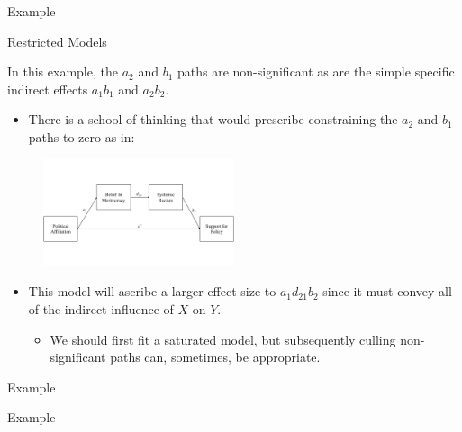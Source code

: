 \documentclass{beamer}
\newcommand{\vb}[0]{\vspace{6pt}}
\begin{document}
\begin{frame}[shrink = 5]{Example}
  


\end{frame}


\begin{frame}{Restricted Models}
  
  In this example, the $a_2$ and $b_1$ paths are non-significant as
  are the simple specific indirect effects $a_1b_1$ and $a_2b_2$.
  \vb
  \begin{itemize}
  \item There is a school of thinking that would prescribe
    constraining the $a_2$ and $b_1$ paths to zero as in:
  \end{itemize}
  
  \begin{figure}
    \includegraphics[width=0.5\textwidth]{figures/adamsKlpsSerial1_restricted.pdf}
  \end{figure}
  
  \begin{itemize}
  \item This model will ascribe a larger effect size to
    $a_1d_{21}b_2$ since it must convey all of the indirect influence
    of $X$ on $Y$.
    \vb
    \begin{itemize}
    \item We should first fit a saturated model, but subsequently
      culling non-significant paths can, sometimes, be appropriate.
    \end{itemize}
  \end{itemize}
  
\end{frame}


\begin{frame}[allowframebreaks]{Example}
  


\end{frame}


\begin{frame}[shrink = 5]{Example}
  


\end{frame}
\end{document}
